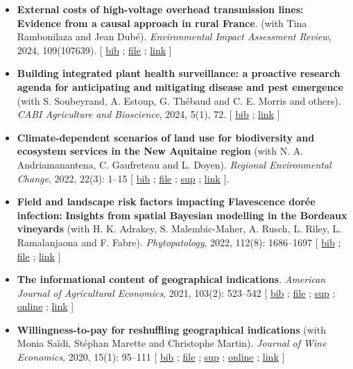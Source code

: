 \documentclass[11pt, a4paper]{./style}
\begin{document}
\begin{itemize}
\item \textbf{External costs of high-voltage overhead transmission lines:
Evidence from a causal approach in rural France}. (with Tina
Rambonilaza and Jean Dubé). \emph{Environmental Impact Assessment
Review}, 2024, 109(107639). [ \href{bib/MDFD.bib}{bib} ; \href{doc/HVTOL-FILE.pdf}{file} ; \href{https://www.sciencedirect.com/science/article/pii/S0195925524002269}{link} ]
\item \textbf{Building integrated plant health surveillance: a proactive
research agenda for anticipating and mitigating disease and pest
emergence} (with S. Soubeyrand, A. Estoup, G. Thébaud and
C. E. Morris and others). \emph{CABI Agriculture and Bioscience},
2024, 5(1), 72. [ \href{bib/MDFD.bib}{bib} ; \href{https://link.springer.com/article/10.1186/s43170-024-00273-8}{link} ]
\item \textbf{Climate-dependent scenarios of land use for biodiversity and
ecosystem services in the New Aquitaine region} (with
N. A. Andriamanantena, C. Gaufreteau and L. Doyen). \emph{Regional
Environmental Change}, 2022, 22(3): 1--15 [ \href{bib/MDFD.bib}{bib} ; \href{doc/CDSA-FILE.pdf}{file} ; \href{doc/CDSA-SUP.pdf}{sup} ;
\href{https://link.springer.com/article/10.1007/s10113-022-01964-6}{link} ].
\item \textbf{Field and landscape risk factors impacting Flavescence dorée
infection:} \textbf{Insights from spatial Bayesian modelling in the
Bordeaux vineyards} (with H. K. Adrakey, S. Malembic-Maher,
A. Rusch, L. Riley, L. Ramalanjaona and
F. Fabre). \emph{Phytopatology}, 2022, 112(8): 1686--1697 [ \href{bib/MDFD.bib}{bib} ; \href{doc/MDFD-FILE.pdf}{file}
; \href{https://apsjournals.apsnet.org/doi/10.1094/PHYTO-10-21-0449-R}{link} ]
\item \textbf{The informational content of geographical
indications}. \emph{American Journal of Agricultural Economics}, 2021,
103(2): 523--542 [ \href{bib/GEOIND.bib}{bib} ; \href{doc/GEOIND-FILE.pdf}{file} ; \href{doc/GEOIND-SUP.pdf}{sup} ; \href{https://github.com/jsay/geoInd/}{online} ; \href{https://onlinelibrary.wiley.com/doi/full/10.1111/ajae.12100}{link} ]
\item \textbf{Willingness-to-pay for reshuffling geographical indications}
(with Monia Saïdi, Stéphan Marette and Christophe
Martin). \emph{Journal of Wine Economics}, 2020, 15(1): 95--111 [ \href{bib/RFGI.bib}{bib}
; \href{doc/RFGI-FILE.pdf}{file} ; \href{doc/RFGI-SUP.pdf}{sup} ; \href{https://github.com/jsay/reshufGI/}{online} ; \href{https://www.cambridge.org/core/journals/journal-of-wine-economics/article/abs/willingnesstopay-for-reshuffling-geographical-indications/FD4DB1BCA54C1E204773BF861965BEBD}{link} ]

\end{itemize}
\end{document}
